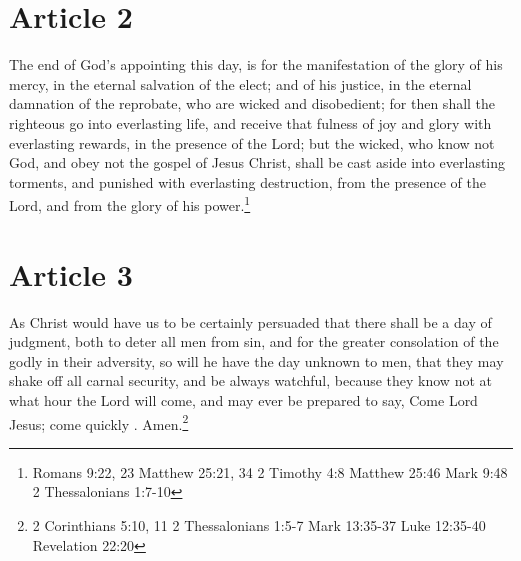 \documentclass[12pt,letterpaper]{book}
\begin{document}
\section{Article 2}

The end of God's appointing this day, is for the manifestation of the glory of his mercy, in the eternal salvation of the elect; and of his justice, in the eternal damnation of the reprobate, who are wicked and disobedient; for then shall the righteous go into everlasting life, and receive that fulness of joy and glory with everlasting rewards, in the presence of the Lord; but the wicked, who know not God, and obey not the gospel of Jesus Christ, shall be cast aside into everlasting torments, and punished with everlasting destruction, from the presence of the Lord, and from the glory of his power.\footnote{Romans 9:22, 23 Matthew 25:21, 34 2 Timothy 4:8 Matthew 25:46 Mark 9:48 2 Thessalonians 1:7-10}

\section{Article 3}

As Christ would have us to be certainly persuaded that there shall be a day of judgment, both to deter all men from sin, and for the greater consolation of the godly in their adversity, so will he have the day unknown to men, that they may shake off all carnal security, and be always watchful, because they know not at what hour the Lord will come, and may ever be prepared to say, Come Lord Jesus; come quickly . Amen.\footnote{2 Corinthians 5:10, 11 2 Thessalonians 1:5-7 Mark 13:35-37 Luke 12:35-40 Revelation 22:20}
\end{document}
